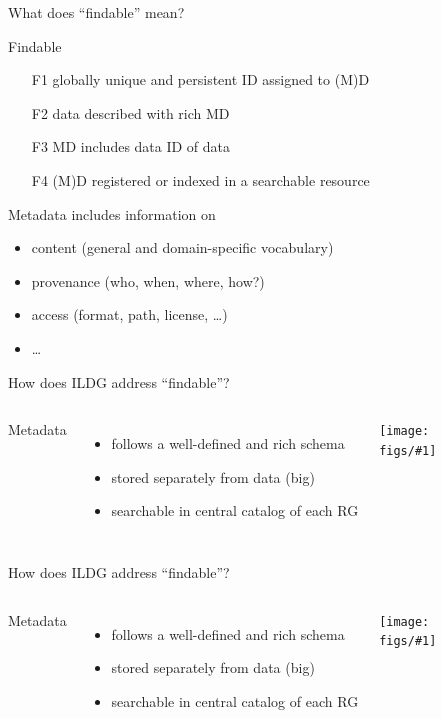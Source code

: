 \documentclass[aspectratio=169,xcolor=dvipsnames]{beamer}
\def\figs{figs2}
\begin{document}
\begin{frame}{What does ``findable'' mean?}
  \begin{alertblock}{Findable}
    \begin{itemize}
      \item[F1] globally unique and persistent ID assigned to (M)D
      \item[F2] data described with rich MD %
      \item[F3] MD includes data ID of data
      \item[F4] (M)D registered or indexed in a searchable resource
    \end{itemize}
  \end{alertblock}

  Metadata includes information on
  \begin{itemize}
  \item content (general and domain-specific vocabulary)
  \item provenance (who, when, where, how?)
  \item access (format, path, license, \ldots)
  \item \ldots
  \end{itemize}

\end{frame}
\newcommand{\access}[1]{
\begin{frame}{How does ILDG address ``findable''?}
  \begin{columns}[c] 
    \column{0.5\textwidth}
    Metadata
    \begin{itemize}
    \item follows a well-defined and rich schema
    \item stored \alert{separately} from data (big)
    \item searchable in central catalog of \alert{each} RG
    \end{itemize}
    
    \column{0.5\textwidth}
    \hspace*{-3mm}
    \texttt{[image: \\figs/\#1]}
  \end{columns}
\end{frame}
}
\access{ildg-access1schema}
\access{ildg-access2}
\end{document}
